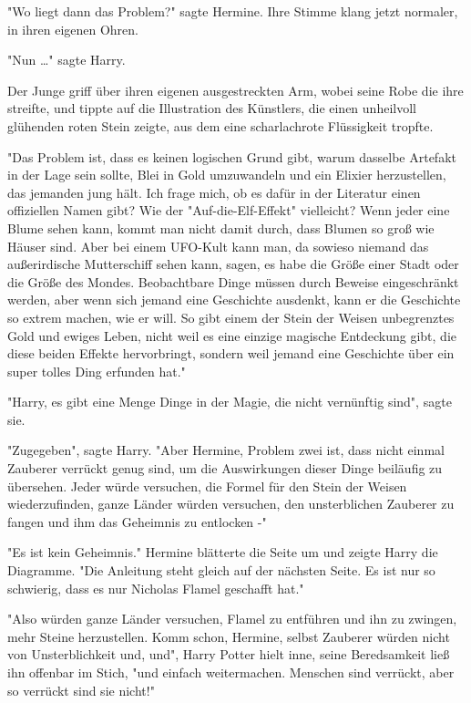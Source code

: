 {"Wo liegt dann das Problem?" sagte Hermine. Ihre Stimme klang jetzt normaler, in ihren eigenen Ohren.

"Nun …" sagte Harry.

Der Junge griff über ihren eigenen ausgestreckten Arm, wobei seine Robe die ihre streifte, und tippte auf die Illustration des Künstlers, die einen unheilvoll glühenden roten Stein zeigte, aus dem eine scharlachrote Flüssigkeit tropfte.

"Das Problem ist, dass es keinen logischen Grund gibt, warum dasselbe Artefakt in der Lage sein sollte, Blei in Gold umzuwandeln und ein Elixier herzustellen, das jemanden jung hält. Ich frage mich, ob es dafür in der Literatur einen offiziellen Namen gibt? Wie der "Auf-die-Elf-Effekt" vielleicht? Wenn jeder eine Blume sehen kann, kommt man nicht damit durch, dass Blumen so groß wie Häuser sind. Aber bei einem UFO-Kult kann man, da sowieso niemand das außerirdische Mutterschiff sehen kann, sagen, es habe die Größe einer Stadt oder die Größe des Mondes. Beobachtbare Dinge müssen durch Beweise eingeschränkt werden, aber wenn sich jemand eine Geschichte ausdenkt, kann er die Geschichte so extrem machen, wie er will. So gibt einem der Stein der Weisen unbegrenztes Gold und ewiges Leben, nicht weil es eine einzige magische Entdeckung gibt, die diese beiden Effekte hervorbringt, sondern weil jemand eine Geschichte über ein super tolles Ding erfunden hat."

"Harry, es gibt eine Menge Dinge in der Magie, die nicht vernünftig sind", sagte sie.

"Zugegeben", sagte Harry. "Aber Hermine, Problem zwei ist, dass nicht einmal Zauberer verrückt genug sind, um die Auswirkungen dieser Dinge beiläufig zu übersehen. Jeder würde versuchen, die Formel für den Stein der Weisen wiederzufinden, ganze Länder würden versuchen, den unsterblichen Zauberer zu fangen und ihm das Geheimnis zu entlocken -"

"Es ist kein Geheimnis." Hermine blätterte die Seite um und zeigte Harry die Diagramme. "Die Anleitung steht gleich auf der nächsten Seite. Es ist nur so schwierig, dass es nur Nicholas Flamel geschafft hat."

"Also würden ganze Länder versuchen, Flamel zu entführen und ihn zu zwingen, mehr Steine herzustellen. Komm schon, Hermine, selbst Zauberer würden nicht von Unsterblichkeit und, und", Harry Potter hielt inne, seine Beredsamkeit ließ ihn offenbar im Stich, "und einfach weitermachen. Menschen sind verrückt, aber so verrückt sind sie nicht!"

}
